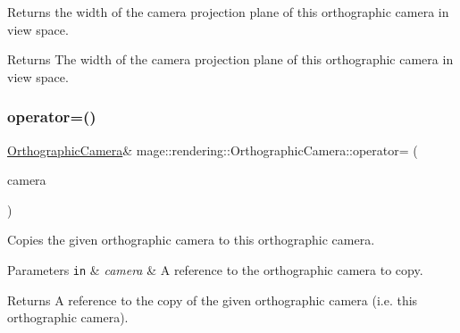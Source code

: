 Returns the width of the camera projection plane of this orthographic camera in view space.

\begin{DoxyReturn}{Returns}
The width of the camera projection plane of this orthographic camera in view space. 
\end{DoxyReturn}
\hypertarget{classmage_1_1rendering_1_1_orthographic_camera_adcd0a977ed5245aa4224dd1a679586f7}{}\label{classmage_1_1rendering_1_1_orthographic_camera_adcd0a977ed5245aa4224dd1a679586f7} 
\subsubsection{\texorpdfstring{operator=()}{operator=()}\hspace{0.1cm}{\footnotesize\ttfamily [1/2]}}
{\footnotesize\ttfamily \hyperlink{classmage_1_1rendering_1_1_orthographic_camera}{Orthographic\+Camera}\& mage\+::rendering\+::\+Orthographic\+Camera\+::operator= (\begin{DoxyParamCaption}\item[{const \hyperlink{classmage_1_1rendering_1_1_orthographic_camera}{Orthographic\+Camera} \&}]{camera }\end{DoxyParamCaption})\hspace{0.3cm}{\ttfamily [delete]}}

Copies the given orthographic camera to this orthographic camera.


\begin{DoxyParams}[1]{Parameters}
\mbox{\tt in}  & {\em camera} & A reference to the orthographic camera to copy. \\
\hline
\end{DoxyParams}
\begin{DoxyReturn}{Returns}
A reference to the copy of the given orthographic camera (i.\+e. this orthographic camera). 
\end{DoxyReturn}
\hypertarget{classmage_1_1rendering_1_1_orthographic_camera_aa4518e7ef41bc0d841719198ac59d41f}{}\label{classmage_1_1rendering_1_1_orthographic_camera_aa4518e7ef41bc0d841719198ac59d41f} 

